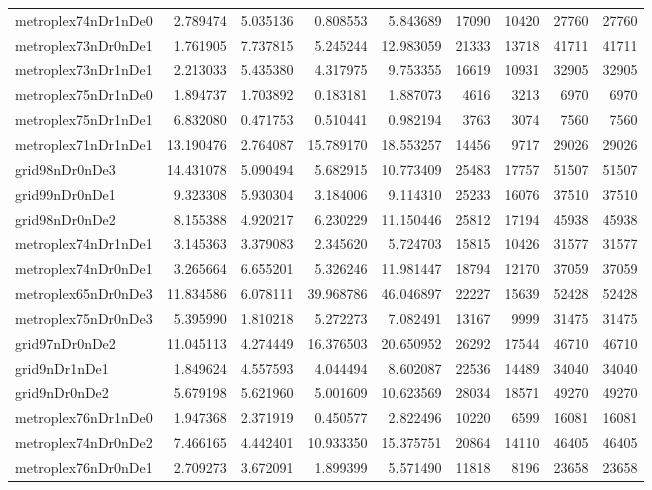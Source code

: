 \begin{longtable}{|l|r|r|r|r|r|r|r|r|}
metroplex74nDr1nDe0 & 2.789474 & 5.035136 & 0.808553 & 5.843689 & 17090 & 10420 & 27760 & 27760 \\
metroplex73nDr0nDe1 & 1.761905 & 7.737815 & 5.245244 & 12.983059 & 21333 & 13718 & 41711 & 41711 \\
metroplex73nDr1nDe1 & 2.213033 & 5.435380 & 4.317975 & 9.753355 & 16619 & 10931 & 32905 & 32905 \\
metroplex75nDr1nDe0 & 1.894737 & 1.703892 & 0.183181 & 1.887073 & 4616 & 3213 & 6970 & 6970 \\
metroplex75nDr1nDe1 & 6.832080 & 0.471753 & 0.510441 & 0.982194 & 3763 & 3074 & 7560 & 7560 \\
metroplex71nDr1nDe1 & 13.190476 & 2.764087 & 15.789170 & 18.553257 & 14456 & 9717 & 29026 & 29026 \\
grid98nDr0nDe3 & 14.431078 & 5.090494 & 5.682915 & 10.773409 & 25483 & 17757 & 51507 & 51507 \\
grid99nDr0nDe1 & 9.323308 & 5.930304 & 3.184006 & 9.114310 & 25233 & 16076 & 37510 & 37510 \\
grid98nDr0nDe2 & 8.155388 & 4.920217 & 6.230229 & 11.150446 & 25812 & 17194 & 45938 & 45938 \\
metroplex74nDr1nDe1 & 3.145363 & 3.379083 & 2.345620 & 5.724703 & 15815 & 10426 & 31577 & 31577 \\
metroplex74nDr0nDe1 & 3.265664 & 6.655201 & 5.326246 & 11.981447 & 18794 & 12170 & 37059 & 37059 \\
metroplex65nDr0nDe3 & 11.834586 & 6.078111 & 39.968786 & 46.046897 & 22227 & 15639 & 52428 & 52428 \\
metroplex75nDr0nDe3 & 5.395990 & 1.810218 & 5.272273 & 7.082491 & 13167 & 9999 & 31475 & 31475 \\
grid97nDr0nDe2 & 11.045113 & 4.274449 & 16.376503 & 20.650952 & 26292 & 17544 & 46710 & 46710 \\
grid9nDr1nDe1 & 1.849624 & 4.557593 & 4.044494 & 8.602087 & 22536 & 14489 & 34040 & 34040 \\
grid9nDr0nDe2 & 5.679198 & 5.621960 & 5.001609 & 10.623569 & 28034 & 18571 & 49270 & 49270 \\
metroplex76nDr1nDe0 & 1.947368 & 2.371919 & 0.450577 & 2.822496 & 10220 & 6599 & 16081 & 16081 \\
metroplex74nDr0nDe2 & 7.466165 & 4.442401 & 10.933350 & 15.375751 & 20864 & 14110 & 46405 & 46405 \\
metroplex76nDr0nDe1 & 2.709273 & 3.672091 & 1.899399 & 5.571490 & 11818 & 8196 & 23658 & 23658 \\

\end{longtable}
